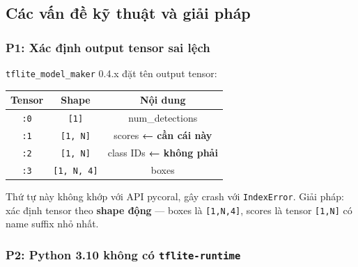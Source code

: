 


\subsection{Các vấn đề kỹ thuật và giải pháp}
\label{subsec:ai3-issues}

\subsubsection*{P1: Xác định output tensor sai lệch}

\texttt{tflite\_model\_maker} 0.4.x đặt tên output tensor:

\begin{center}\small
\begin{tabular}{ccc}
  \toprule
  Tensor & Shape & Nội dung \\
  \midrule
  \texttt{:0} & \texttt{[1]}       & num\_detections \\
  \texttt{:1} & \texttt{[1,\,N]}   & scores \textbf{← cần cái này} \\
  \texttt{:2} & \texttt{[1,\,N]}   & class IDs \textbf{← không phải} \\
  \texttt{:3} & \texttt{[1,\,N,\,4]} & boxes \\
  \bottomrule
\end{tabular}
\end{center}

Thứ tự này không khớp với API pycoral, gây crash với
\texttt{IndexError}. Giải pháp: xác định tensor theo
\textbf{shape động} --- boxes là \texttt{[1,N,4]}, scores là
tensor \texttt{[1,N]} có name suffix nhỏ nhất.

\subsubsection*{P2: Python 3.10 không có \texttt{tflite-runtime}}

